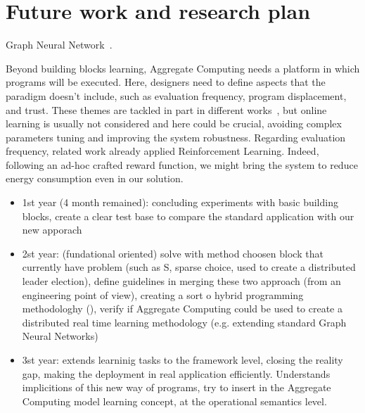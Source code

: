 \documentclass[conference]{IEEEtran}
\begin{document}
\section{Future work and research plan}
Graph Neural Network~\cite{DBLP:journals/tnn/ScarselliGTHM09}.

Beyond building blocks learning, Aggregate Computing needs a platform in which programs will be executed. 
Here, designers need to define aspects that the paradigm doesn't include, 
such as evaluation frequency, program displacement, and trust. 
These themes are tackled in part in different works~\cite{DBLP:journals/scp/CasadeiAV18, DBLP:journals/fi/CasadeiPPVW20, DBLP:journals/corr/abs-2012-13806}, 
but online learning is usually not considered and here could be crucial, 
avoiding complex parameters tuning and improving the system robustness.
Regarding evaluation frequency, related work already applied Reinforcement Learning. 
Indeed, following an ad-hoc crafted reward function, we might bring the system to reduce energy 
consumption even in our solution.
\begin{itemize}
    \item 1st year (4 month remained): concluding experiments with basic building blocks, create a clear test base to compare the standard application with our new apporach
    \item 2st year: (fundational oriented) solve with method choosen block that currently have problem (such as S, sparse choice, used to create a distributed leader election),
    define guidelines in merging these two approach (from an engineering point of view), creating a sort o hybrid programming methodologhy (), verify if Aggregate Computing could be used to create a distributed real time learning methodology (e.g. extending standard Graph Neural Networks)
    \item 3st year: extends learninig tasks to the framework level, closing the reality gap, making the deployment in real application efficiently. Understands implicitions
    of this new way of programs, try to insert in the Aggregate Computing model learning concept, at the operational semantics level. 
\end{itemize}



\end{document}
